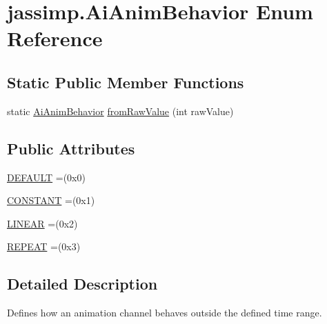 \hypertarget{enumjassimp_1_1_ai_anim_behavior}{\section{jassimp.\+Ai\+Anim\+Behavior Enum Reference}
\label{enumjassimp_1_1_ai_anim_behavior}
}
\subsection*{Static Public Member Functions}
\begin{DoxyCompactItemize}
\item 
static \hyperlink{enumjassimp_1_1_ai_anim_behavior}{Ai\+Anim\+Behavior} \hyperlink{enumjassimp_1_1_ai_anim_behavior_a284a6087577d3a9023904db0bf14cdc1}{from\+Raw\+Value} (int raw\+Value)
\end{DoxyCompactItemize}
\subsection*{Public Attributes}
\begin{DoxyCompactItemize}
\item 
\hyperlink{enumjassimp_1_1_ai_anim_behavior_ab12c1ddd4d41cbae806540c02f71943b}{D\+E\+F\+A\+U\+L\+T} =(0x0)
\item 
\hyperlink{enumjassimp_1_1_ai_anim_behavior_a0bf7bab418fc45aa393744cf92a8a2c1}{C\+O\+N\+S\+T\+A\+N\+T} =(0x1)
\item 
\hyperlink{enumjassimp_1_1_ai_anim_behavior_a01192c9e7ec585ba829450a7be9bdd2f}{L\+I\+N\+E\+A\+R} =(0x2)
\item 
\hyperlink{enumjassimp_1_1_ai_anim_behavior_a6b93f88c0311f026dce06e0743ef2fd0}{R\+E\+P\+E\+A\+T} =(0x3)
\end{DoxyCompactItemize}


\subsection{Detailed Description}
Defines how an animation channel behaves outside the defined time range. 

